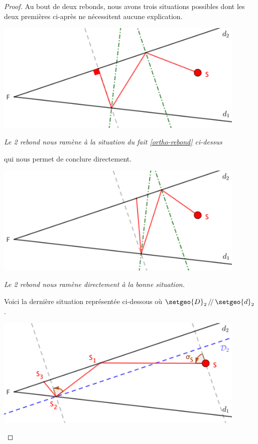 \begin{proof}
	Au bout de deux rebonds, nous avons trois situations possibles dont les deux premières ci-après ne nécessitent aucune explication.
	
	
	\medskip
	
	\begin{center}
		\includegraphics[width=12cm]{content/proof-starting-with-d2-2-bounces-to-ortho.png}

		\itshape\small
		Le 2\ieme{} rebond nous ramène à la situation du fait \ref{ortho-rebond} ci-dessus
		
		qui nous permet de conclure directement.
	\end{center}
	
	
	\medskip
	
	\begin{center}
		\includegraphics[width=12cm]{content/proof-starting-with-d2-2-bounces-to-infinity.png}

		\itshape\small
		Le 2\ieme{} rebond nous ramène directement à la bonne situation.
	\end{center}
	
	
	\medskip
	
	Voici la dernière situation représentée ci-dessous où $\setgeo{D}_2 \, /\!/ \, \setgeo{d}_2$.
	
	
	\medskip
	
	\begin{center}
		\includegraphics[width=12cm]{content/proof-starting-with-d2-2-bounces-to-F.png}


\end{center}
\end{proof}
